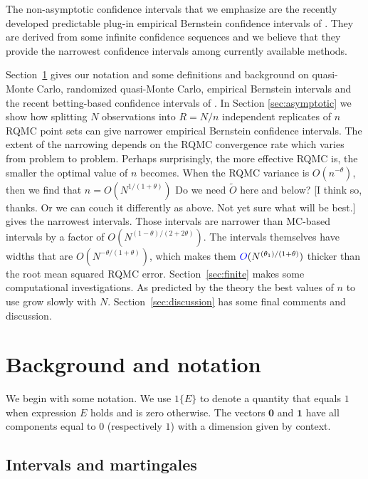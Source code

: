 \documentclass{article}
\newcommand{\art}[1]{\begingroup\color{blue}#1\endgroup}
\newcommand{\fred}[1]{\begingroup\color{red}#1\endgroup}
\newcommand{\bsone}{\boldsymbol{1}}
\newcommand{\bszero}{\boldsymbol{0}}
\begin{document}
The non-asymptotic confidence intervals that we emphasize are the
recently developed predictable plug-in empirical Bernstein
confidence intervals of \cite{WauRam24a}. They are derived
from some infinite confidence sequences and we believe that
they provide the narrowest confidence intervals among
currently available methods.

Section~\ref{sec:notation} gives our notation
and some definitions and background on quasi-Monte
Carlo, randomized quasi-Monte Carlo, empirical Bernstein
intervals and the recent betting-based confidence
intervals of \cite{WauRam24a}. In Section \ref{sec:asymptotic}
we show how splitting $N$ observations into $R=N/n$ independent
replicates of $n$ RQMC point sets can give narrower
empirical Bernstein confidence intervals.  The extent of the
narrowing depends on the RQMC convergence rate which
varies from problem to problem. Perhaps surprisingly,
the more effective RQMC is, the smaller the optimal value
of $n$ becomes. \art{When the RQMC variance is $O(n^{-\theta})$, then} we find that $n=O(N^{1/(1+\theta)})$ \fred{Do we need $\tilde O$ here and below?} \art{[I think so, thanks. Or we can couch it differently as above. Not yet
sure what will be best.]} gives
the narrowest intervals.  Those intervals are narrower
than MC-based intervals by a factor of $O(N^{(1-\theta)/(2+2\theta)})$.
The intervals themselves have widths that are
$O(N^{-\theta/(1+\theta)})$\fred{, which makes them $\art{O}(N^{(\theta_1)/(1+\theta)})$ thicker than the root mean squared RQMC error}. Section~\ref{sec:finite} makes
some computational investigations.  As predicted by the theory
the best values of $n$ to use grow slowly with $N$.
Section~\ref{sec:discussion} has some final comments
and discussion.


\section{Background and notation}\label{sec:notation}

We begin with some notation.
We use $1\{E\}$ to denote a quantity that equals $1$
when expression $E$ holds and is zero otherwise.
The vectors $\bszero$ and $\bsone$ have all components
equal to $0$ (respectively $1$) with a dimension
given by context.

\subsection{Intervals and martingales}
\end{document}
